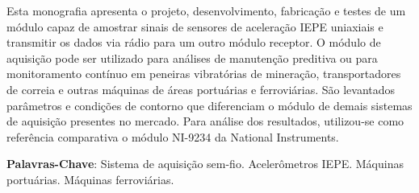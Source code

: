 \documentclass[
	12pt,				%
	openright,			%
	twoside,			%
	a4paper,			%
	english,			%
	french,				%
	spanish,			%
	brazil,				%
	]{abntex2}
\begin{document}
\frenchspacing 


\imprimircapa

\imprimirfolhaderosto




\setlength{\absparsep}{18pt} %
\begin{resumo}
	Esta monografia apresenta o projeto, desenvolvimento, fabricação e testes de um módulo capaz de amostrar sinais de sensores de aceleração IEPE uniaxiais e transmitir os dados via rádio para um outro módulo receptor. O módulo de aquisição pode ser utilizado para análises de manutenção preditiva ou para monitoramento contínuo em peneiras vibratórias de mineração, transportadores de correia e outras máquinas de áreas portuárias e ferroviárias. São levantados parâmetros e condições de contorno que diferenciam o módulo de demais sistemas de aquisição presentes no mercado. Para análise dos resultados, utilizou-se como referência comparativa o módulo NI-9234 da National Instruments.

	\vspace{\onelineskip}

	\noindent 
	\textbf{Palavras-Chave}: Sistema de aquisição sem-fio. Acelerômetros IEPE. Máquinas portuárias. Máquinas ferroviárias.
\end{resumo}
\end{document}

